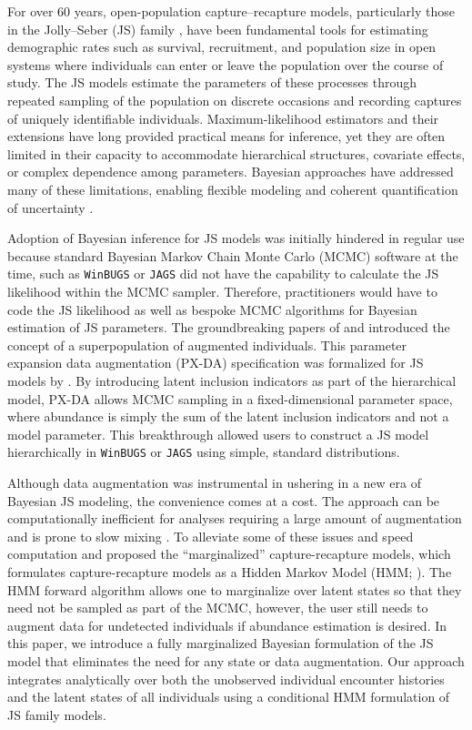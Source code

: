 \documentclass[11pt]{article}
\begin{document}
For over 60 years, open-population capture–recapture models, particularly those in the Jolly–Seber (JS) family \citep{Jolly1965,Seber1965}, have been fundamental tools for estimating demographic rates such as survival, recruitment, and population size in open systems where individuals can enter or leave the population over the course of study. The JS models estimate the parameters of these processes through repeated sampling of the population on discrete occasions and recording captures of uniquely identifiable individuals. Maximum-likelihood estimators and their extensions \citep{schwarz1996general} have long provided practical means for inference, yet they are often limited in their capacity to accommodate hierarchical structures, covariate effects, or complex dependence among parameters. Bayesian approaches have addressed many of these limitations, enabling flexible modeling and coherent quantification of uncertainty \citep{Royle:2008kx}. 

Adoption of Bayesian inference for JS models was initially hindered in regular use because standard Bayesian Markov Chain Monte Carlo (MCMC) software at the time, such as {\tt WinBUGS} \citep{LunnEtAl2000a} or {\tt JAGS} \citep{plummer2003jags} did not have the capability to calculate the JS likelihood within the MCMC sampler. Therefore, practitioners would have to code the JS likelihood as well as bespoke MCMC algorithms for Bayesian estimation of JS parameters. The groundbreaking papers of \cite{Durban:2005yw} and \cite{Royle:2007kx} introduced the concept of a superpopulation of augmented individuals. This parameter expansion data augmentation (PX-DA) specification was formalized for JS models by \cite{RoyleDorazio2012a}. By introducing latent inclusion indicators as part of the hierarchical model, PX-DA allows MCMC sampling in a fixed-dimensional parameter space, where abundance is simply the sum of the latent inclusion indicators and not a model parameter. This breakthrough allowed users to construct a JS model hierarchically in {\tt WinBUGS} or {\tt JAGS} using simple, standard distributions.

Although data augmentation was instrumental in ushering in a new era of Bayesian JS modeling, the convenience comes at a cost. The approach can be computationally inefficient for analyses requiring a large amount of augmentation \citep{Royle:2007kx} and is prone to slow mixing \citep{SchofieldBarker2008a}. To alleviate some of these issues and speed computation \cite{yackulic2020need} and \cite{saracco2023fast} proposed the ``marginalized'' capture-recapture models, which formulates capture-recapture models as a Hidden Markov Model (HMM; \citealt{zucchini2016hidden}). The HMM forward algorithm allows one to marginalize over latent states so that they need not be sampled as part of the MCMC, however, the user still needs to augment data for undetected individuals if abundance estimation is desired. In this paper, we introduce a fully marginalized Bayesian formulation of the JS model that eliminates the need for any state or data augmentation. Our approach integrates analytically over both the unobserved individual encounter histories and the latent states of all individuals using a conditional HMM formulation of JS family models. 
\end{document}
